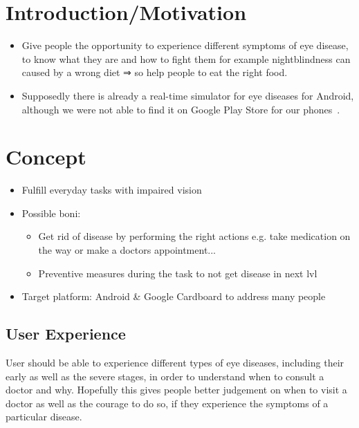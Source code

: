 \documentclass{acm_proc_article-sp}
\begin{document}
%

%
%
% 

\section{Introduction/Motivation}
\begin{itemize}
  \item Give people the opportunity to experience different symptoms of eye
      disease, to know what they are and how to fight them for example
      nightblindness can caused by a wrong diet
      ⇒ so help people to eat the right food.
  \item Supposedly there is already a real-time simulator for eye diseases for
      Android, although we were not able to find it on Google Play Store for
      our phones \cite{braille}.
\end{itemize}

\section{Concept}

\begin{itemize}
  \item Fulfill everyday tasks with impaired vision
  \item Possible boni: 
  \begin{itemize}
    \item Get rid of disease by performing the right actions
    e.g. take medication on the way or make a doctors appointment...
    \item Preventive measures during the task to not get disease in next lvl
  \end{itemize}
  \item Target platform: Android \& Google Cardboard to address many people
\end{itemize}

\subsection{User Experience}

User should be able to experience different types of eye diseases, including
their early as well as the severe stages, in order to understand when to consult
a doctor and why. Hopefully this gives people better judgement on when to visit
a doctor as well as the courage to do so, if they experience the symptoms of
a particular disease.
\end{document}

